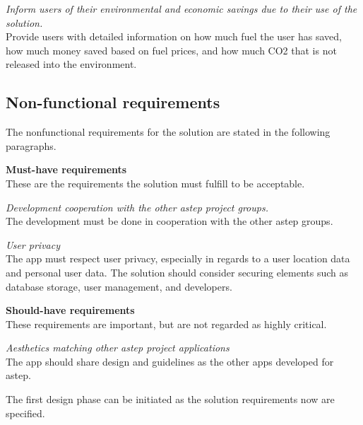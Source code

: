 \textit{Inform users of their environmental and economic savings due to their use of the solution.}\\
Provide users with detailed information on how much fuel the user has saved, how much money saved based on fuel prices, and how much CO2 that is not released into the environment. 

\subsection{Non-functional requirements}
The nonfunctional requirements for the solution are stated in the following paragraphs.

\textbf{Must-have requirements}\\
These are the requirements the solution must fulfill to be acceptable.

\textit{Development cooperation with the other \gls{astep} project groups.}\\
The development must be done in cooperation with the other \gls{astep} groups.

\textit{User privacy}\\
The app must respect user privacy, especially in regards to a user location data and personal user data.
The solution should consider securing elements such as database storage, user management, and developers.

\textbf{Should-have requirements}\\
These requirements are important, but are not regarded as highly critical.

\textit{Aesthetics matching other \gls{astep} project applications}\\
The app should share design and guidelines as the other apps developed for \gls{astep}.

The first design phase can be initiated as the solution requirements now are specified. 